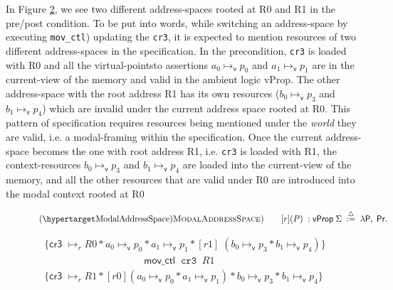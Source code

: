 In Figure \ref{fig:addrswitch}, we see two different address-spaces rooted at R0 and R1 in the pre/post condition. To be put into words, while switching an address-space by executing \lstinline|mov_ctl|) updating the  \lstinline|cr3|, it is expected to mention resources of two different address-spaces in the specification. In the precondition,  \lstinline|cr3| is loaded with R0 and all the virtual-pointsto assertions $a_0 \mapsto_{\textsf{v}}p_0$ and $a_1 \mapsto_{\textsf{v}}p_1$ are in the current-view of the memory and valid in the ambient logic \textsf{vProp}. The other address-space with the root address R1 has its own resources ($b_0 \mapsto_{\textsf{v}}p_3$ and $b_1 \mapsto_{\textsf{v}}p_4$) which are invalid under the current address space rooted at R0. This pattern of specification requires resources being mentioned under the \textit{world} they are valid, i.e. a modal-framing within the specification. Once the current address-space becomes the one with root address R1, i.e.  \lstinline|cr3| is loaded with R1, the context-resources $b_0 \mapsto_{\textsf{v}}p_3$ and $b_1 \mapsto_{\textsf{v}}p_4$ are loaded into the current-view of the memory, and all the other resources that are valid under R0 are introduced into the modal context rooted at R0
\begin{figure}
\[
  \begin{array}{l}
    \hbox{(\TirNameStyle{ModalAddressSpace)}} \qquad
         [r](P) \;: \mathsf{vProp} \; \Sigma \; \stackrel{\triangle}{:=} \; \lambda \mathsf{P},\; \mathsf{P r}. 
  \end{array}
  \]
  \label{fig:modaldef}
  \end{figure}
  
\begin{figure}
\[
\begin{array}{l}
  \{ \textsf{cr3 } \mapsto_{r} R0 \ast a_0 \mapsto_{\textsf{v}}p_0  \ast a_1 \mapsto_{\textsf{v}}p_1  \ast [r1]\;( b_0 \mapsto_{\textsf{v}}p_3  \ast b_1 \mapsto_{\textsf{v}}p_4 )\}\\
  \qquad \qquad \qquad \qquad \qquad \mathsf{mov\_ctl} \;\; \texttt{cr3} \; \; R1\\

  \{ \textsf{cr3 } \mapsto_{r} R1 \ast [r0](a_0 \mapsto_{\textsf{v}}p_0  \ast a_1 \mapsto_{\textsf{v}}p_1)  \ast  b_0 \mapsto_{\textsf{v}}p_3  \ast b_1 \mapsto_{\textsf{v}}p_4 \}
  \end{array}
\]
  \label{fig:addrswitch}
  \end{figure}

